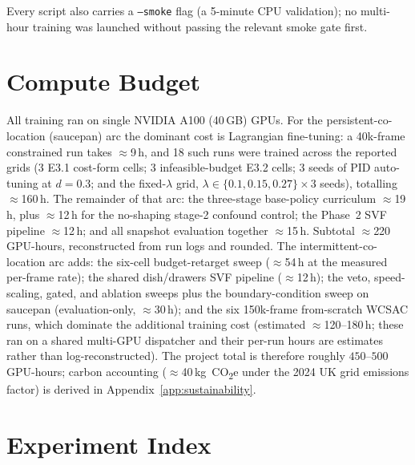 \documentclass[11pt,a4paper]{report}
\begin{document}
\label{sec:setup:smoke}%
Every script also carries a \texttt{--smoke} flag (a 5-minute CPU
validation); no multi-hour training was launched without passing the
relevant smoke gate first.

\section{Compute Budget}
\label{sec:setup:compute}

All training ran on single NVIDIA A100 (40\,GB) GPUs. For the
persistent-co-location (saucepan) arc the dominant cost is Lagrangian
fine-tuning: a 40k-frame constrained run takes $\approx$9\,h, and 18
such runs were trained across the reported grids (3 E3.1 cost-form
cells; 3 infeasible-budget E3.2 cells; 3 seeds of PID auto-tuning at
$d = 0.3$; and the fixed-$\lambda$ grid,
$\lambda \in \{0.1, 0.15, 0.27\} \times 3$ seeds), totalling
$\approx$160\,h. The remainder of that arc: the three-stage
base-policy curriculum $\approx$19\,h, plus $\approx$12\,h for the
no-shaping stage-2 confound control; the Phase~2 SVF pipeline
$\approx$12\,h; and all snapshot evaluation together $\approx$15\,h.
Subtotal $\approx$220\,GPU-hours, reconstructed from run logs and
rounded. The intermittent-co-location arc adds: the six-cell
budget-retarget sweep ($\approx$54\,h at the measured per-frame
rate); the shared dish/drawers SVF pipeline ($\approx$12\,h); the
veto, speed-scaling, gated, and ablation sweeps plus the
boundary-condition sweep on saucepan (evaluation-only,
$\approx$30\,h); and the six 150k-frame from-scratch WCSAC runs,
which dominate the additional training cost (estimated
$\approx$120--180\,h; these ran on a shared multi-GPU dispatcher and
their per-run hours are estimates rather than log-reconstructed).
The project total is therefore roughly $450$--$500$\,GPU-hours;
carbon accounting ($\approx$40\,kg~CO\textsubscript{2}e under the
2024 UK grid emissions factor) is derived in
Appendix~\ref{app:sustainability}.

\section{Experiment Index}
\label{sec:setup:exp-index}
\end{document}
